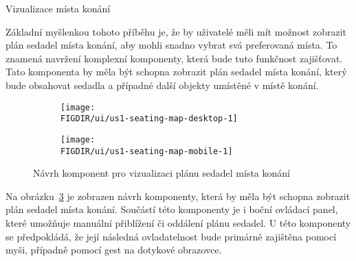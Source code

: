 \begin{subsection}{Vizualizace místa konání}
    \label{subsec:narvh-ui-transformace-uzivatelskych-pribehu-vizualizace-mista-konani}
    \userstoryvenuemap

    Základní myšlenkou tohoto příběhu je, že by uživatelé měli mít možnost zobrazit plán sedadel místa konání, aby mohli snadno vybrat svá preferovaná místa.
    To znamená navržení komplexní komponenty, která bude tuto funkčnost zajišťovat.
    Tato komponenta by měla být schopna zobrazit plán sedadel místa konání, který bude obsahovat sedadla a případné další objekty umístěné v místě konání.

    \begin{figure}[H]
        \centering
        \begin{subfigure}{0.775\textwidth}
            \texttt{[image: \\FIGDIR/ui/us1-seating-map-desktop-1]}
            \label{fig:us1-seating-map-desktop-1}
        \end{subfigure}
        \begin{subfigure}{0.2\textwidth}
            \texttt{[image: \\FIGDIR/ui/us1-seating-map-mobile-1]}
            \label{fig:us1-seating-map-mobile-1}
        \end{subfigure}
        \caption{Návrh komponent pro vizualizaci plánu sedadel místa konání}
        \label{fig:us1-seating-map}
    \end{figure}

    Na obrázku~\ref{fig:us1-seating-map} je zobrazen návrh komponenty, která by měla být schopna zobrazit plán sedadel místa konání.
    Součástí této komponenty je i boční ovládací panel, které umožňuje manuální přiblížení či oddálení plánu sedadel.
    U této komponenty se předpokládá, že její následná ovladatelnost bude primárně zajištěna pomocí myši, případně pomocí gest na dotykové obrazovce.

\end{subsection}


